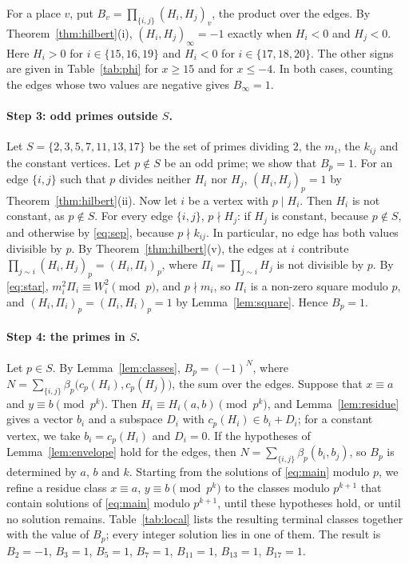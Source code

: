 \documentclass[11pt]{article}
\begin{document}
For a place $v$, put $B_v=\prod_{\{i,j\}}(H_i,H_j)_v$, the product over the edges. By Theorem~\ref{thm:hilbert}(i), $(H_i,H_j)_\infty=-1$ exactly when $H_i<0$ and $H_j<0$. Here $H_i>0$ for $i\in\{15,\allowbreak 16,\allowbreak 19\}$ and $H_i<0$ for $i\in\{17,\allowbreak 18,\allowbreak 20\}$. The other signs are given in Table~\ref{tab:phi} for $x\geq15$ and for $x\leq-4$. In both cases, counting the edges whose two values are negative gives $B_\infty=1$.

\paragraph{Step 3: odd primes outside $S$.} Let $S=\{2,3,5,7,11,13,17\}$ be the set of primes dividing $2$, the $m_{i}$, the $k_{ij}$ and the constant vertices. Let $p\notin S$ be an odd prime; we show that $B_p=1$. For an edge $\{i,j\}$ such that $p$ divides neither $H_i$ nor $H_j$, $(H_i,H_j)_p=1$ by Theorem~\ref{thm:hilbert}(ii). Now let $i$ be a vertex with $p\mid H_i$. Then $H_i$ is not constant, as $p\notin S$. For every edge $\{i,j\}$, $p\nmid H_j$: if $H_j$ is constant, because $p\notin S$, and otherwise by \eqref{eq:sep}, because $p\nmid k_{ij}$. In particular, no edge has both values divisible by $p$. By Theorem~\ref{thm:hilbert}(v), the edges at $i$ contribute $\prod_{j\sim i}(H_i,H_j)_p=(H_i,\Pi_i)_p$, where $\Pi_i=\prod_{j\sim i}H_j$ is not divisible by $p$. By \eqref{eq:star}, $m_i^2\Pi_i\equiv W_i^2\pmod p$, and $p\nmid m_i$, so $\Pi_i$ is a non-zero square modulo $p$, and $(H_i,\Pi_i)_p=(\Pi_i,H_i)_p=1$ by Lemma~\ref{lem:square}. Hence $B_p=1$.

\paragraph{Step 4: the primes in $S$.} Let $p\in S$. By Lemma~\ref{lem:classes}, $B_p=(-1)^{N}$, where $N=\sum_{\{i,j\}}\beta_p\bigl(c_p(H_i),c_p(H_j)\bigr)$, the sum over the edges. Suppose that $x\equiv a$ and $y\equiv b\pmod{p^k}$. Then $H_i\equiv H_i(a,b)\pmod{p^k}$, and Lemma~\ref{lem:residue} gives a vector $b_i$ and a subspace $D_i$ with $c_p(H_i)\in b_i+D_i$; for a constant vertex, we take $b_i=c_p(H_i)$ and $D_i=0$. If the hypotheses of Lemma~\ref{lem:envelope} hold for the edges, then $N=\sum_{\{i,j\}}\beta_p(b_i,b_j)$, so $B_p$ is determined by $a$, $b$ and $k$. Starting from the solutions of \eqref{eq:main} modulo $p$, we refine a residue class $x\equiv a$, $y\equiv b\pmod{p^k}$ to the classes modulo $p^{k+1}$ that contain solutions of \eqref{eq:main} modulo $p^{k+1}$, until these hypotheses hold, or until no solution remains. Table~\ref{tab:local} lists the resulting terminal classes together with the value of $B_p$; every integer solution lies in one of them. The result is $B_{2}=-1$, $B_{3}=1$, $B_{5}=1$, $B_{7}=1$, $B_{11}=1$, $B_{13}=1$, $B_{17}=1$.
\end{document}

